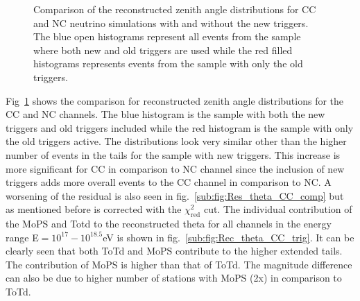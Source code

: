 \begin{figure}[h!]
  \centering
  \hfill
  \caption{Comparison of the reconstructed zenith angle distributions for CC and NC neutrino simulations with and without the new triggers. The blue open histograms represent all events from the sample where both new and old triggers are used while the red filled histograms represents events from the sample with only the old triggers.} 
  \label{fig:Rec_Theta_comp}
\end{figure}
 Fig~\ref{fig:Rec_Theta_comp} shows the comparison for reconstructed zenith angle distributions for the CC and NC channels. The blue histogram is the sample with both the new triggers and old triggers included while the red histogram is the sample with only the old triggers active. The distributions look very similar other than the higher number of events in the tails for the sample with new triggers. This increase is more significant for CC in comparison to NC channel since the inclusion of new triggers adds more overall events to the CC channel in comparison to NC. A worsening of the residual is also seen in fig.~\ref{sub:fig:Res_theta_CC_comp} but as mentioned before is corrected with the $\chi^2_{\text{red}}$ cut. 
 The individual contribution of the MoPS and Totd to the reconstructed theta for all channels in the energy range E$=10^{17}-10^{18.5}$eV is shown in fig.~\ref{sub:fig:Rec_theta_CC_trig}. It can be clearly seen that both ToTd and MoPS contribute to the higher extended tails. The contribution of MoPS is higher than that of ToTd. The magnitude difference can also be due to higher number of stations with MoPS (2x) in comparison to ToTd.
 

